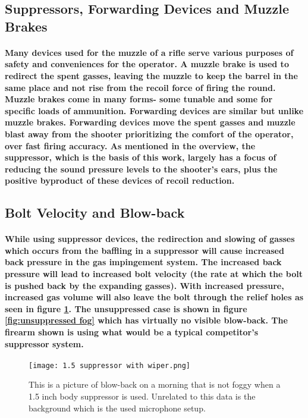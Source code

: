 \subsection{Suppressors, Forwarding Devices and Muzzle Brakes}

\paragraph{Many devices used for the muzzle of a rifle serve various purposes of safety and conveniences for the operator. A muzzle brake is used to redirect the spent gasses, leaving the muzzle to keep the barrel in the same place and not rise from the recoil force of firing the round. Muzzle brakes come in many forms- some tunable and some for specific loads of ammunition. Forwarding devices are similar but unlike muzzle brakes. Forwarding devices move the spent gasses and muzzle blast away from the shooter prioritizing the comfort of the operator, over fast firing accuracy. As mentioned in the overview, the suppressor, which is the basis of this work, largely has a focus of reducing the sound pressure levels to the shooter's ears, plus the positive byproduct of these devices of recoil reduction.\cite{recoilweb2022}\cite{opticsplanet2021}\cite{nraila2022}}





\subsection{Bolt Velocity and Blow-back}
\paragraph{While using suppressor devices, the redirection and slowing of gasses which occurs from the baffling in a suppressor will cause increased back pressure in the gas impingement system. The increased back pressure will lead to increased bolt velocity (the rate at which the bolt is pushed back by the expanding gasses). With increased pressure, increased gas volume will also leave the bolt through the relief holes as seen in figure \ref{fig:Avg suppressor blow-back}. The unsuppressed case is shown in figure \ref{fig:unsuppressed fog} which has virtually no visible blow-back. The firearm shown is using what would be a typical competitor's suppressor system.}





\begin{figure}[h]
	\centering
	\texttt{[image: 1.5 suppressor with wiper.png]}
	\caption[Negative of Blow back]{This is a picture of blow-back on a morning that is not foggy when a 1.5 inch body suppressor is used. Unrelated to this data is the background which is the used microphone setup.}
	\label{fig:Avg suppressor blow-back}
\end{figure}



